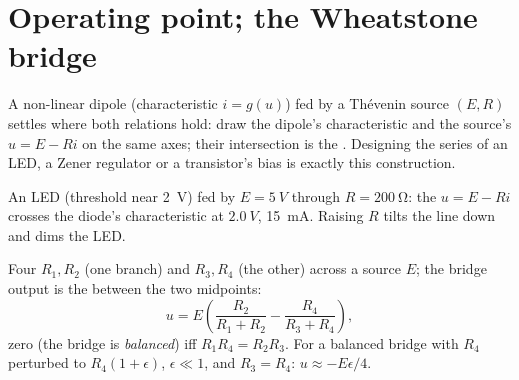 \section{Operating point; the Wheatstone bridge}

\begin{method}\label{met:b1:dc-circuits:loadline}
A non-linear dipole (characteristic $i = g(u)$) fed by a Thévenin
source $(E, R)$ settles where both relations hold: draw the dipole's
characteristic and the source's \emph{} $u = E - Ri$ on the
same axes; their intersection is the \emph{}. Designing
the series  of an LED, a Zener regulator or a transistor's bias
is exactly this construction.
\end{method}

\begin{omfigure}

{\small An LED (threshold near \qty{2}{V}) fed by $E = \qty{5}{V}$
through $R = \qty{200}{\ohm}$: the  $u = E - Ri$ crosses the
diode's characteristic at $\qty{2.0}{V}$, \qty{15}{mA}. Raising $R$
tilts the line down and dims the LED.}
\end{omfigure}

\begin{proposition}\label{prop:b1:dc-circuits:wheatstone}
Four  $R_1, R_2$ (one branch) and $R_3, R_4$ (the other) across
a source $E$; the bridge output is the  between the two
midpoints:
\[
u = E\left(\frac{R_2}{R_1 + R_2} - \frac{R_4}{R_3 + R_4}\right),
\]
zero (the bridge is \emph{balanced}) iff $R_1R_4 = R_2R_3$. For a
balanced bridge with $R_4$ perturbed to $R_4(1 + \epsilon)$, $\epsilon
\ll 1$, and $R_3 = R_4$: $u \approx -E\epsilon/4$.
\end{proposition}

